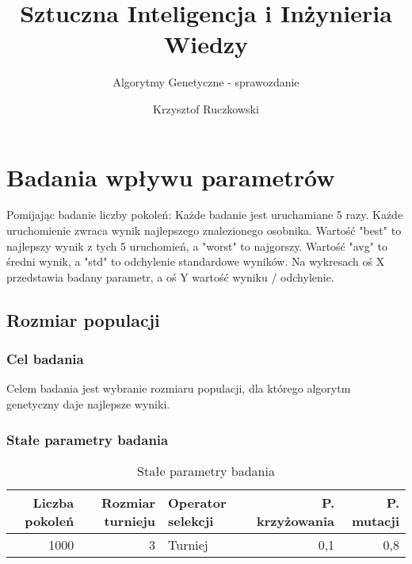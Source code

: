 \documentclass[12pt,a4paper]{article}
\author{Krzysztof Ruczkowski}
\title{Sztuczna Inteligencja i Inżynieria Wiedzy}
\subtitle{Algorytmy Genetyczne - sprawozdanie}
\begin{document}
\maketitle
\tableofcontents
\newpage

\section{Badania wpływu parametrów}
Pomijając badanie liczby pokoleń:
Każde badanie jest uruchamiane 5 razy.
Każde uruchomienie zwraca wynik najlepszego znalezionego osobnika.
Wartość "best" to najlepszy wynik z tych 5 uruchomień, a "worst" to najgorszy.
Wartość "avg" to średni wynik, a "std" to odchylenie standardowe wyników.
Na wykresach oś X przedstawia badany parametr, a oś Y wartość wyniku / odchylenie.
\subsection{Rozmiar populacji}
\subsubsection{Cel badania}
Celem badania jest wybranie rozmiaru populacji, dla którego algorytm genetyczny daje najlepsze wyniki.

\subsubsection{Stałe parametry badania}
\begin{table}[htbp]
  \centering
    \begin{tabular}{rrlrr}
    \multicolumn{1}{p{3.93em}}{\textbf{Liczba pokoleń}} & \multicolumn{1}{p{4.07em}}{\textbf{Rozmiar turnieju}} & \multicolumn{1}{p{4.07em}}{\textbf{Operator selekcji}} & \multicolumn{1}{p{5.715em}}{\textbf{P. krzyżowania}} & \multicolumn{1}{p{5.355em}}{\textbf{P.  mutacji}} \\
    \midrule
    1000  & 3     & Turniej & 0,1   & 0,8 \\
    \end{tabular}%
  \label{tab:addlabel}%
  \caption{Stałe parametry badania}
\end{table}%
\end{document}
